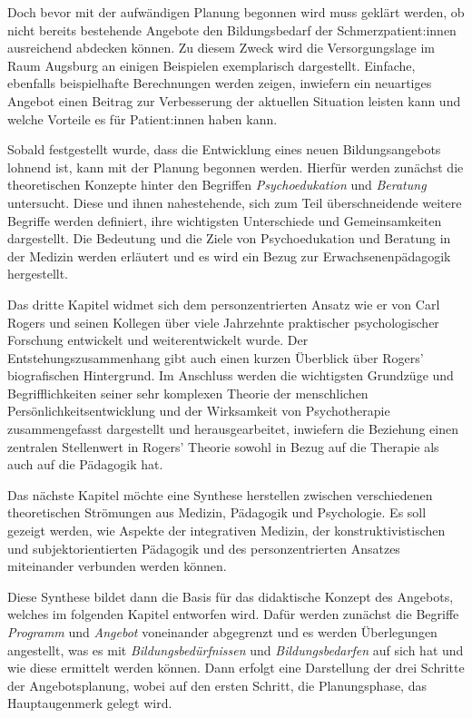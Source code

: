 \documentclass[
  twoside,
  parskip=half-,
]{scrreprt}
\begin{document}
Doch bevor mit der aufwändigen Planung begonnen wird muss geklärt werden, ob nicht bereits bestehende Angebote den Bildungsbedarf der Schmerzpatient:innen ausreichend abdecken können. Zu diesem Zweck wird die Versorgungslage im Raum Augsburg an einigen Beispielen exemplarisch dargestellt. Einfache, ebenfalls beispielhafte Berechnungen werden zeigen, inwiefern ein neuartiges Angebot einen Beitrag zur Verbesserung der aktuellen Situation leisten kann und welche Vorteile es für Patient:innen haben kann.

Sobald festgestellt wurde, dass die Entwicklung eines neuen Bildungsangebots lohnend ist, kann mit der Planung begonnen werden. Hierfür werden zunächst die theoretischen Konzepte hinter den Begriffen \textit{Psychoedukation} und \textit{Beratung} untersucht. Diese und ihnen nahestehende, sich zum Teil überschneidende weitere Begriffe werden definiert, ihre wichtigsten Unterschiede und Gemeinsamkeiten dargestellt. Die Bedeutung und die Ziele von Psychoedukation und Beratung in der Medizin werden erläutert und es wird ein Bezug zur Erwachsenenpädagogik hergestellt. 

Das dritte Kapitel widmet sich dem personzentrierten Ansatz wie er von Carl Rogers und seinen Kollegen über viele Jahrzehnte praktischer psychologischer Forschung entwickelt und weiterentwickelt wurde. Der Entstehungszusammenhang gibt auch einen kurzen Überblick über Rogers' biografischen Hintergrund. Im Anschluss werden die wichtigsten Grundzüge und Begrifflichkeiten seiner sehr komplexen Theorie der menschlichen Persönlichkeitsentwicklung und der Wirksamkeit von Psychotherapie zusammengefasst dargestellt und herausgearbeitet, inwiefern die Beziehung einen zentralen Stellenwert in Rogers' Theorie sowohl in Bezug auf die Therapie als auch auf die Pädagogik hat.

Das nächste Kapitel möchte eine Synthese herstellen zwischen verschiedenen theoretischen Strömungen aus Medizin, Pädagogik und Psychologie. Es soll gezeigt werden, wie Aspekte der integrativen Medizin, der konstruktivistischen und subjektorientierten Pädagogik und des personzentrierten Ansatzes miteinander verbunden werden können.

Diese Synthese bildet dann die Basis für das didaktische Konzept des Angebots, welches im folgenden Kapitel entworfen wird. Dafür werden zunächst die Begriffe \textit{Programm} und \textit{Angebot} voneinander abgegrenzt und es werden Überlegungen angestellt, was es mit \textit{Bildungsbedürfnissen} und \textit{Bildungsbedarfen} auf sich hat und wie diese ermittelt werden können. Dann erfolgt eine Darstellung der drei Schritte der Angebotsplanung, wobei auf den ersten Schritt, die Planungsphase, das Hauptaugenmerk gelegt wird.
\end{document}
